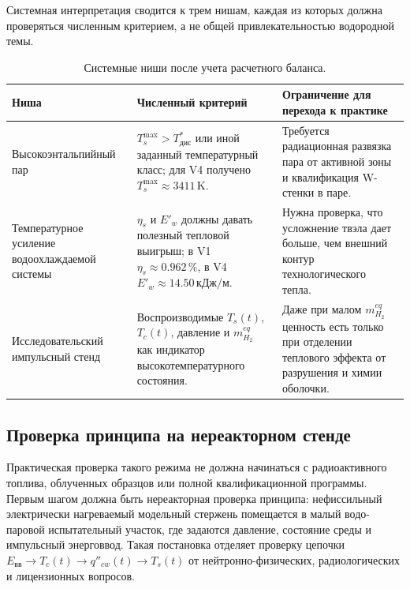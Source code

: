 \documentclass[12pt]{article}
\begin{document}
Системная интерпретация сводится к трем нишам, каждая из которых должна проверяться численным критерием, а не общей привлекательностью водородной темы.

\begin{table}[H]
    \centering
    \small
    \renewcommand{\arraystretch}{1.2}
    \begin{tabularx}{\textwidth}{@{}p{}X X@{}}
        \toprule
        Ниша & Численный критерий & Ограничение для перехода к практике\\
        \midrule
        Высокоэнтальпийный пар & \(T_s^{\max}>T^*_{\mathrm{дис}}\) или иной заданный температурный класс; для V4 получено \(T_s^{\max}\approx3411\,\mathrm{K}\). & Требуется радиационная развязка пара от активной зоны и квалификация W-стенки в паре.\\
        Температурное усиление водоохлаждаемой системы & \(\eta_s\) и \(E'_w\) должны давать полезный тепловой выигрыш; в V1 \(\eta_s\approx0.962\,\%\), в V4 \(E'_w\approx14.50\,\mathrm{кДж/м}\). & Нужна проверка, что усложнение твэла дает больше, чем внешний контур технологического тепла.\\
        Исследовательский импульсный стенд & Воспроизводимые \(T_s(t)\), \(T_c(t)\), давление и \(m_{H_2}^{eq}\) как индикатор высокотемпературного состояния. & Даже при малом \(m_{H_2}^{eq}\) ценность есть только при отделении теплового эффекта от разрушения и химии оболочки.\\
        \bottomrule
    \end{tabularx}
    \caption{Системные ниши после учета расчетного баланса.}
    \label{tab:applicationNiches}
\end{table}

\subsection{Проверка принципа на нереакторном стенде}

Практическая проверка такого режима не должна начинаться с радиоактивного топлива, облученных образцов или полной квалификационной программы. Первым шагом должна быть нереакторная проверка принципа: нефиссильный электрически нагреваемый модельный стержень помещается в малый водо-паровой испытательный участок, где задаются давление, состояние среды и импульсный энерговвод. Такая постановка отделяет проверку цепочки \(E_{\mathrm{вв}}\rightarrow T_c(t)\rightarrow q''_{cw}(t)\rightarrow T_s(t)\) от нейтронно-физических, радиологических и лицензионных вопросов.
\end{document}

